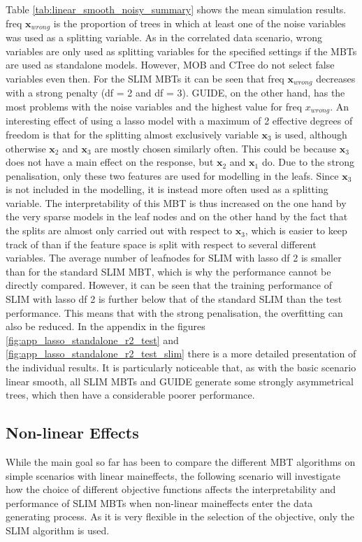 Table \ref{tab:linear_smooth_noisy_summary} shows the mean simulation results. freq $ \textbf{x}_{wrong}$ is the proportion of trees in which at least one of the noise variables was used as a splitting variable. 
As in the correlated data scenario, wrong variables are only used as splitting variables for the specified settings if the MBTs are used as standalone models. However, MOB and CTree do not select false variables even then. For the SLIM MBTs it can be seen that freq $\textbf{x}_{wrong}$ decreases with a strong penalty (df = 2 and df = 3). GUIDE, on the other hand, has the most problems with the noise variables and the highest value for freq $x_{wrong}$.
An interesting effect of using a lasso model with a maximum of 2 effective degrees of freedom is that for the splitting almost exclusively variable $\textbf{x}_3$ is used, although otherwise $\textbf{x}_2$ and $\textbf{x}_3$ are mostly chosen similarly often. This could be because $\textbf{x}_3$ does not have a main effect on the response, but $\textbf{x}_2$ and $\textbf{x}_1$ do.  Due to the strong penalisation, only these two features are used for modelling in the leafs. Since $\textbf{x}_3$ is not included in the modelling, it is instead more often used as a splitting variable.
The interpretability of this MBT is thus increased on the one hand by the very sparse models in the leaf nodes and on the other hand by the fact that the splits are almost only carried out with respect to $\textbf{x}_3$, which is easier to keep track of than if the feature space is split with respect to several different variables.
The average number of leafnodes for SLIM with lasso df 2 is smaller than for the standard SLIM MBT, which is why the performance cannot be directly compared.  However, it can be seen that the training performance of SLIM with lasso df 2 is further below that of the standard SLIM than the test performance. This means that with the strong penalisation, the overfitting can also be reduced.
In the appendix in the figures \ref{fig:app_lasso_standalone_r2_test} and \ref{fig:app_lasso_standalone_r2_test_slim} there is a more detailed presentation of the individual results. It is particularly noticeable that, as with the basic scenario linear smooth, all SLIM MBTs and GUIDE generate some strongly asymmetrical trees, which then have a considerable poorer performance.




\subsection{Non-linear Effects}
While the main goal so far has been to compare the different MBT algorithms on simple scenarios with linear maineffects, the following scenario will investigate how the choice of different objective functions affects the interpretability and performance of SLIM MBTs when non-linear maineffects enter the data generating process. 
As it is very flexible in the selection of the objective, only the SLIM algorithm is used.

